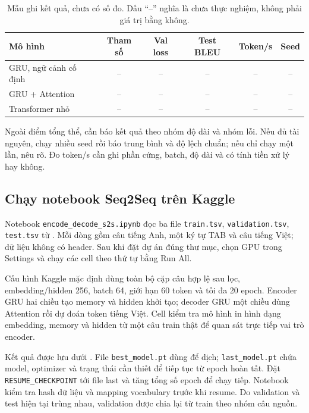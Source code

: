\documentclass[11pt,a4paper]{article}
\numberwithin{equation}{section}
\begin{document}
\begin{table}[H]
\centering\small
\begin{tabularx}{\linewidth}{@{}Yccccc@{}}
\toprule{}Mô hình & Tham số & Val loss & Test BLEU & Token/s & Seed\\\midrule
GRU, ngữ cảnh cố định & -- & -- & -- & -- & --\\
GRU + Attention & -- & -- & -- & -- & --\\
Transformer nhỏ & -- & -- & -- & -- & --\\
\bottomrule
\end{tabularx}
\caption{Mẫu ghi kết quả, chưa có số đo. Dấu ``--'' nghĩa là chưa thực nghiệm, không phải giá trị bằng không.}
\end{table}
Ngoài điểm tổng thể, cần báo kết quả theo nhóm độ dài và nhóm lỗi. Nếu đủ tài nguyên, chạy nhiều seed rồi báo trung bình và độ lệch chuẩn; nếu chỉ chạy một lần, nêu rõ. Đo token/s cần ghi phần cứng, batch, độ dài và có tính tiền xử lý hay không.

\subsection{Chạy notebook Seq2Seq trên Kaggle}
Notebook \texttt{encode\_decode\_s2s.ipynb} đọc ba file \texttt{train.tsv}, \texttt{validation.tsv}, \texttt{test.tsv} từ . Mỗi dòng gồm câu tiếng Anh, một ký tự TAB và câu tiếng Việt; dữ liệu không có header. Sau khi đặt dự án đúng thư mục, chọn GPU trong Settings và chạy các cell theo thứ tự bằng Run All.

Cấu hình Kaggle mặc định dùng toàn bộ cặp câu hợp lệ sau lọc, embedding/hidden 256, batch 64, giới hạn 60 token và tối đa 20 epoch. Encoder GRU hai chiều tạo memory và hidden khởi tạo; decoder GRU một chiều dùng Attention rồi dự đoán token tiếng Việt. Cell kiểm tra mô hình in hình dạng embedding, memory và hidden từ một câu train thật để quan sát trực tiếp vai trò encoder.

Kết quả được lưu dưới . File \texttt{best\_model.pt} dùng để dịch; \texttt{last\_model.pt} chứa model, optimizer và trạng thái cần thiết để tiếp tục từ epoch hoàn tất. Đặt \texttt{RESUME\_CHECKPOINT} tới file last và tăng tổng số epoch để chạy tiếp. Notebook kiểm tra hash dữ liệu và mapping vocabulary trước khi resume. Do validation và test hiện tại trùng nhau, validation được chia lại từ train theo nhóm câu nguồn.
\end{document}
